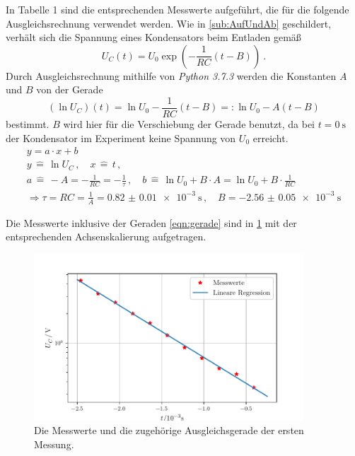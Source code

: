 In Tabelle 1 %
 sind die entsprechenden Messwerte aufgeführt, die für die folgende Ausgleichsrechnung verwendet werden. 
Wie in \ref{sub:AufUndAb} geschildert, verhält sich die Spannung eines Kondensators beim Entladen gemäß 
\begin{equation}
    U_C(t)=U_0 \exp(-\frac{1}{RC}(t-B))\:.
\end{equation}
Durch Ausgleichsrechnung mithilfe von \textit{Python 3.7.3} werden die Konstanten $A$ und $B$ von der Gerade
\begin{equation}
    (\ln{U_C})(t) = \ln{U_0} -\frac{1}{RC}(t-B) =: \ln{U_0} -A(t-B)
    \label{eqn:gerade} %
\end{equation} 
bestimmt. $B$ wird hier für die Verschiebung der Gerade benutzt, da bei ${t=\SI{0}{\second}}$ der Kondensator im Experiment 
keine Spannung von $U_0$ erreicht. 
\begin{gather}
    y=a\cdot x + b \\
    y \,\widehat{=}\, \ln{U_C} \,, \quad
    x \,\widehat{=}\, t\,, \\
    a \,\widehat{=}\,-A=-\frac{1}{RC}=-\frac{1}{\tau} \,, \quad
    b \,\widehat{=}\, \ln{U_0} +B\cdot A = \ln{U_0} +B\cdot \frac{1}{RC} \\
    \Rightarrow 
    \tau=RC=\frac{1}{A}=\SI{0.82(1)e-3}{\second} \,, \quad 
    B=\SI{-2.56(5)e-3}{\second} 
\end{gather}

Die Messwerte inklusive der Geraden \eqref{eqn:gerade} sind in \ref{fig:ausgl_gr_A} 
mit der entsprechenden Achsenskalierung aufgetragen. 

\begin{figure}
    \centering
    \includegraphics[width=0.9\textwidth]{plots/ausgleichsgerade.pdf}
    \caption{Die Messwerte und die zugehörige Ausgleichsgerade der ersten Messung.}
    \label{fig:ausgl_gr_A}
\end{figure}

